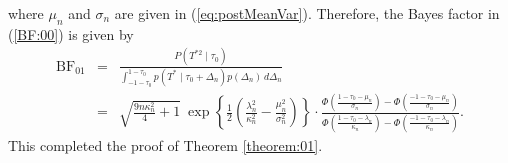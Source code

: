 \documentclass[11pt]{article}
\begin{document}
where $\mu_n$ and $\sigma_n$ are given in (\ref{eq:postMeanVar}). Therefore, the Bayes factor in (\ref{BF:00}) is given by
\begin{eqnarray*}
\mathrm{BF}_{01} &=&  \frac{P(T^{\ast2} \mid \tau_0)}{\int_{-1-\tau_0}^{1-\tau_0}  p(T^\ast \mid \tau_0+\Delta_n)p(\Delta_n)\, d\Delta_n}\\[3pt]
&=&\sqrt{\frac{9n\kappa_n^2}{4}+1} ~\exp \left\{\frac{1}{2}\left(\frac{\lambda_n^2}{\kappa_n^2}- \frac{\mu_n^2 }{\sigma_n^2} \right)  \right\}\cdot \frac{\Phi\left(\frac{1-\tau_0-\mu_n}{\sigma_n}\right)-\Phi\left(\frac{-1-\tau_0-\mu_n}{\sigma_n}\right)}{\Phi\left(\frac{1-\tau_0-\lambda_n}{\kappa_n}\right)-\Phi\left(\frac{-1-\tau_0-\lambda_n}{\kappa_n}\right)}.
\end{eqnarray*}
This completed the proof of Theorem \ref{theorem:01}.
\end{document}
